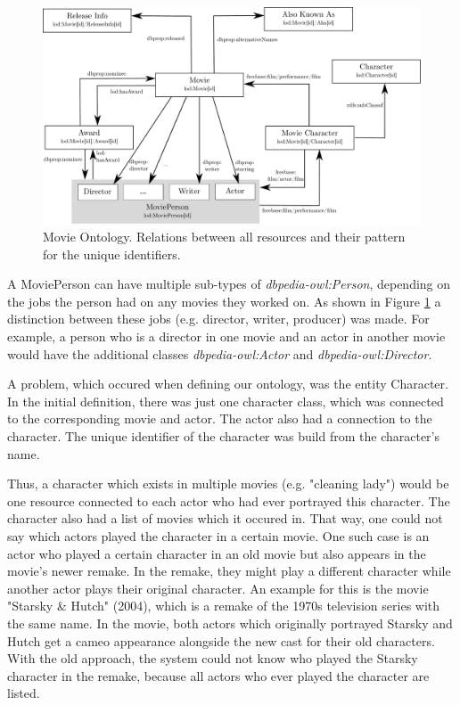 \begin{figure}[h!]
\includegraphics[width=\textwidth]{images/ontology.pdf}
\caption{Movie Ontology. Relations between all resources and their pattern for the unique identifiers.}
\label{fig_ontology}
\end{figure}

A MoviePerson can have multiple sub-types of \textit{dbpedia-owl:Person}, depending on the jobs the person had on any movies they worked on.
As shown in Figure \ref{fig_ontology} a distinction between these jobs (e.g. director, writer, producer) was made.
For example, a person who is a director in one movie and an actor in another movie would have the additional classes \textit{dbpedia-owl:Actor} and \textit{dbpedia-owl:Director}.

A problem, which occured when defining our ontology, was the entity Character.
In the initial definition, there was just one character class, which was connected to the corresponding movie and actor.
The actor also had a connection to the character.
The unique identifier of the character was build from the character's name.

Thus, a character which exists in multiple movies (e.g. "cleaning lady") would be one resource connected to each actor who had ever portrayed this character.
The character also had a list of movies which it occured in.
That way, one could not say which actors played the character in a certain movie.
One such case is an actor who played a certain character in an old movie but also appears in the movie's newer remake.
In the remake, they might play a different character while another actor plays their original character.
An example for this is the movie "Starsky \& Hutch" (2004), which is a remake of the 1970s television series with the same name.
In the movie, both actors which originally portrayed Starsky and Hutch get a cameo appearance alongside the new cast for their old characters.
With the old approach, the system could not know who played the Starsky character in the remake, because all actors who ever played the character are listed.


